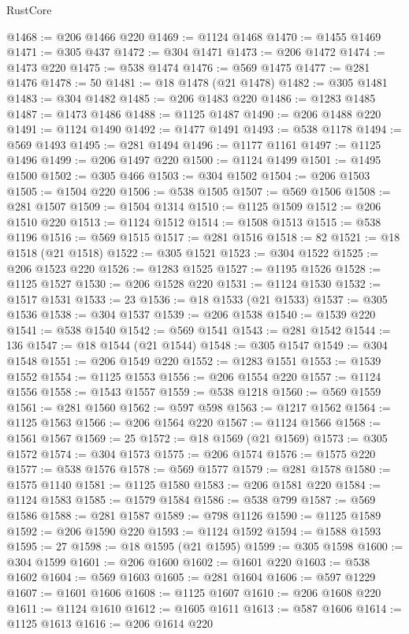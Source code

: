 \begin{lexlean}{RustCore}
\begin{coremodule}
@1468 := @206 @1466 @220
@1469 := @1124 @1468
@1470 := @1455 @1469
@1471 := @305 @437
@1472 := @304 @1471
@1473 := @206 @1472
@1474 := @1473 @220
@1475 := @538 @1474
@1476 := @569 @1475
@1477 := @281 @1476
@1478 := 50
@1481 := @18 @1478 (@21 @1478)
@1482 := @305 @1481
@1483 := @304 @1482
@1485 := @206 @1483 @220
@1486 := @1283 @1485
@1487 := @1473 @1486
@1488 := @1125 @1487
@1490 := @206 @1488 @220
@1491 := @1124 @1490
@1492 := @1477 @1491
@1493 := @538 @1178
@1494 := @569 @1493
@1495 := @281 @1494
@1496 := @1177 @1161
@1497 := @1125 @1496
@1499 := @206 @1497 @220
@1500 := @1124 @1499
@1501 := @1495 @1500
@1502 := @305 @466
@1503 := @304 @1502
@1504 := @206 @1503
@1505 := @1504 @220
@1506 := @538 @1505
@1507 := @569 @1506
@1508 := @281 @1507
@1509 := @1504 @1314
@1510 := @1125 @1509
@1512 := @206 @1510 @220
@1513 := @1124 @1512
@1514 := @1508 @1513
@1515 := @538 @1196
@1516 := @569 @1515
@1517 := @281 @1516
@1518 := 82
@1521 := @18 @1518 (@21 @1518)
@1522 := @305 @1521
@1523 := @304 @1522
@1525 := @206 @1523 @220
@1526 := @1283 @1525
@1527 := @1195 @1526
@1528 := @1125 @1527
@1530 := @206 @1528 @220
@1531 := @1124 @1530
@1532 := @1517 @1531
@1533 := 23
@1536 := @18 @1533 (@21 @1533)
@1537 := @305 @1536
@1538 := @304 @1537
@1539 := @206 @1538
@1540 := @1539 @220
@1541 := @538 @1540
@1542 := @569 @1541
@1543 := @281 @1542
@1544 := 136
@1547 := @18 @1544 (@21 @1544)
@1548 := @305 @1547
@1549 := @304 @1548
@1551 := @206 @1549 @220
@1552 := @1283 @1551
@1553 := @1539 @1552
@1554 := @1125 @1553
@1556 := @206 @1554 @220
@1557 := @1124 @1556
@1558 := @1543 @1557
@1559 := @538 @1218
@1560 := @569 @1559
@1561 := @281 @1560
@1562 := @597 @598
@1563 := @1217 @1562
@1564 := @1125 @1563
@1566 := @206 @1564 @220
@1567 := @1124 @1566
@1568 := @1561 @1567
@1569 := 25
@1572 := @18 @1569 (@21 @1569)
@1573 := @305 @1572
@1574 := @304 @1573
@1575 := @206 @1574
@1576 := @1575 @220
@1577 := @538 @1576
@1578 := @569 @1577
@1579 := @281 @1578
@1580 := @1575 @1140
@1581 := @1125 @1580
@1583 := @206 @1581 @220
@1584 := @1124 @1583
@1585 := @1579 @1584
@1586 := @538 @799
@1587 := @569 @1586
@1588 := @281 @1587
@1589 := @798 @1126
@1590 := @1125 @1589
@1592 := @206 @1590 @220
@1593 := @1124 @1592
@1594 := @1588 @1593
@1595 := 27
@1598 := @18 @1595 (@21 @1595)
@1599 := @305 @1598
@1600 := @304 @1599
@1601 := @206 @1600
@1602 := @1601 @220
@1603 := @538 @1602
@1604 := @569 @1603
@1605 := @281 @1604
@1606 := @597 @1229
@1607 := @1601 @1606
@1608 := @1125 @1607
@1610 := @206 @1608 @220
@1611 := @1124 @1610
@1612 := @1605 @1611
@1613 := @587 @1606
@1614 := @1125 @1613
@1616 := @206 @1614 @220

\end{coremodule}
\end{lexlean}
